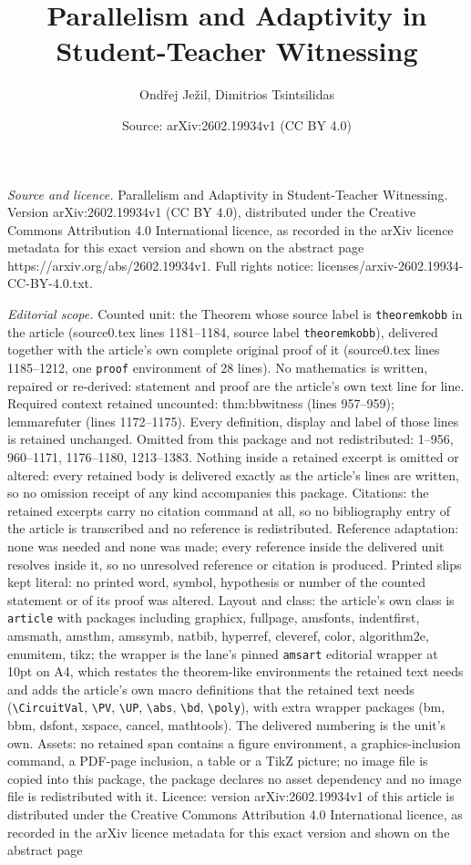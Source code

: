 \documentclass[10pt,a4paper]{amsart}
\title[Parallelism and Adaptivity in Student-Teacher Witnessing]{Parallelism and Adaptivity in Student-Teacher Witnessing}
\author{Ond\v{r}ej Je\v{z}il, Dimitrios Tsintsilidas}
\date{Source: arXiv:2602.19934v1 (CC BY 4.0)}
\begin{document}
\maketitle

\noindent\emph{Source and licence.} Parallelism and Adaptivity in Student-Teacher Witnessing. Version arXiv:2602.19934v1 (CC BY 4.0), distributed under the Creative Commons Attribution 4.0 International licence, as recorded in the arXiv licence metadata for this exact version and shown on the abstract page https://arxiv.org/abs/2602.19934v1. Full rights notice: licenses/arxiv-2602.19934-CC-BY-4.0.txt.\par\smallskip

\noindent\textit{Editorial scope.} Counted unit: the Theorem whose source label is \texttt{theoremkobb} in the article (source0.tex lines 1181--1184, source label \texttt{theoremkobb}), delivered together with the article's own complete original proof of it (source0.tex lines 1185--1212, one \texttt{proof} environment of 28 lines). No mathematics is written, repaired or re-derived: statement and proof are the article's own text line for line. Required context retained uncounted: thm:bbwitness (lines 957--959); lemmarefuter (lines 1172--1175). Every definition, display and label of those lines is retained unchanged. Omitted from this package and not redistributed: 1--956, 960--1171, 1176--1180, 1213--1383. Nothing inside a retained excerpt is omitted or altered: every retained body is delivered exactly as the article's lines are written, so no omission receipt of any kind accompanies this package. Citations: the retained excerpts carry no citation command at all, so no bibliography entry of the article is transcribed and no reference is redistributed. Reference adaptation: none was needed and none was made; every reference inside the delivered unit resolves inside it, so no unresolved reference or citation is produced. Printed slips kept literal: no printed word, symbol, hypothesis or number of the counted statement or of its proof was altered. Layout and class: the article's own class is \texttt{article} with packages including graphicx, fullpage, amsfonts, indentfirst, amsmath, amsthm, amssymb, natbib, hyperref, cleveref, color, algorithm2e, enumitem, tikz; the wrapper is the lane's pinned \texttt{amsart} editorial wrapper at 10pt on A4, which restates the theorem-like environments the retained text needs and adds the article's own macro definitions that the retained text needs (\texttt{\textbackslash CircuitVal}, \texttt{\textbackslash PV}, \texttt{\textbackslash UP}, \texttt{\textbackslash abs}, \texttt{\textbackslash bd}, \texttt{\textbackslash poly}), with extra wrapper packages (bm, bbm, dsfont, xspace, cancel, mathtools). The delivered numbering is the unit's own. Assets: no retained span contains a figure environment, a graphics-inclusion command, a PDF-page inclusion, a table or a TikZ picture; no image file is copied into this package, the package declares no asset dependency and no image file is redistributed with it. Licence: version arXiv:2602.19934v1 of this article is distributed under the Creative Commons Attribution 4.0 International licence, as recorded in the arXiv licence metadata for this exact version and shown on the abstract page 
\end{document}
